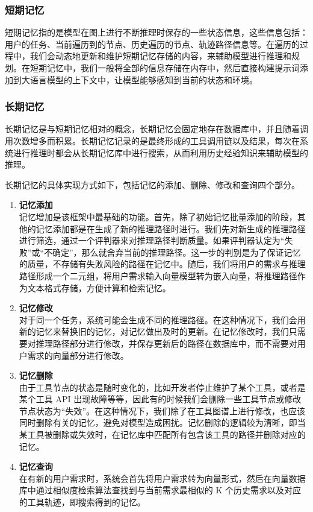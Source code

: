 \subsubsection{短期记忆}

短期记忆指的是模型在图上进行不断推理时保存的一些状态信息，这些信息包括：用户的任务、当前遍历到的节点、历史遍历的节点、轨迹路径信息等。在遍历的过程中，我们会动态地更新和维护短期记忆存储的内容，来辅助模型进行推理和规划。在短期记忆中，我们一般将全部的信息存储在内存中，然后直接构建提示词添加到大语言模型的上下文中，让模型能够感知到当前的状态和环境。

\subsubsection{长期记忆}

长期记忆是与短期记忆相对的概念，长期记忆会固定地存在数据库中，并且随着调用次数增多而积累。长期记忆记录的是最终形成的工具调用链以及结果，每次在系统进行推理时都会从长期记忆库中进行搜索，从而利用历史经验知识来辅助模型的推理。

长期记忆的具体实现方式如下，包括记忆的添加、删除、修改和查询四个部分。

\begin{enumerate}
    \item \textbf{记忆添加} \\
    记忆增加是该框架中最基础的功能。首先，除了初始记忆批量添加的阶段，其他的记忆添加都是在生成了新的推理路径时进行。我们先对新生成的推理路径进行筛选，通过一个评判器来对推理路径判断质量。如果评判器认定为“失败”或“不确定”，那么就舍弃当前的推理路径。这一步的判别是为了保证记忆的质量，不存储有失败风险的路径在记忆中。随后，我们将用户的需求与推理路径形成一个二元组，将用户需求输入向量模型转为嵌入向量，将推理路径作为文本格式存储，方便计算和检索记忆。

    \item \textbf{记忆修改} \\
    对于同一个任务，系统可能会生成不同的推理路径。在这种情况下，我们会用新的记忆来替换旧的记忆，对记忆做出及时的更新。在记忆修改时，我们只需要对推理路径部分进行修改，并保存更新后的路径在数据库中，而不需要对用户需求的向量部分进行修改。

    \item \textbf{记忆删除} \\
    由于工具节点的状态是随时变化的，比如开发者停止维护了某个工具，或者是某个工具 API 出现故障等等，因此有的时候我们会删除一些工具节点或修改节点状态为“失效”。在这种情况下，我们除了在工具图谱上进行修改，也应该同时删除有关的记忆，避免对模型造成困扰。记忆删除的逻辑较为清晰，即当某工具被删除或失效时，在记忆库中匹配所有包含该工具的路径并删除对应的记忆。

    \item \textbf{记忆查询} \\
    在有新的用户需求时，系统会首先将用户需求转为向量形式，然后在向量数据库中通过相似度检索算法查找到与当前需求最相似的 K 个历史需求以及对应的工具轨迹，即搜索得到的记忆。
\end{enumerate}

